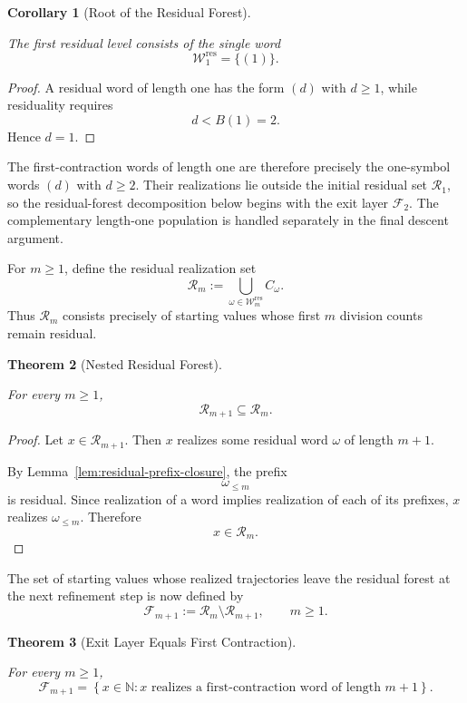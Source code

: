 \documentclass[12pt, oneside]{article}
\numberwithin{equation}{section}
\theoremstyle{definition}
\theoremstyle{plain}
\newtheorem{theorem}{Theorem}[section]
\newtheorem{corollary}[theorem]{Corollary}
\theoremstyle{remark}
\begin{document}
\begin{corollary}[Root of the Residual Forest]
\label{cor:residual-root}

The first residual level consists of the single word
\[
\mathcal W_1^{\mathrm{res}}=\{(1)\}.
\]
\end{corollary}

\begin{proof}
A residual word of length one has the form \((d)\) with \(d\ge1\), while
residuality requires
\[
d<B(1)=2.
\]
Hence \(d=1\).
\end{proof}

The first-contraction words of length one are therefore precisely the
one-symbol words \((d)\) with \(d\ge2\). Their realizations lie outside the
initial residual set \(\mathcal R_1\), so the residual-forest decomposition
below begins with the exit layer \(\mathcal F_2\). The complementary
length-one population is handled separately in the final descent argument.

For \(m\ge1\), define the residual realization set
\[
\mathcal R_m
:=
\bigcup_{\omega\in\mathcal W_m^{\mathrm{res}}}
C_\omega.
\]
Thus \(\mathcal R_m\) consists precisely of starting values whose first
\(m\) division counts remain residual.

\begin{theorem}[Nested Residual Forest]
\label{thm:residual-levels-nested}

For every \(m\ge1\),
\[
\mathcal R_{m+1}\subseteq\mathcal R_m.
\]
\end{theorem}

\begin{proof}
Let \(x\in\mathcal R_{m+1}\). Then \(x\) realizes some residual word
\(\omega\) of length \(m+1\).

By Lemma~\ref{lem:residual-prefix-closure}, the prefix
\[
\omega_{\le m}
\]
is residual. Since realization of a word implies realization of each of its
prefixes, \(x\) realizes \(\omega_{\le m}\). Therefore
\[
x\in\mathcal R_m.
\]
\end{proof}

The set of starting values whose realized trajectories leave the residual
forest at the next refinement step is now defined by
\[
\mathcal F_{m+1}
:=
\mathcal R_m\setminus\mathcal R_{m+1},
\qquad
m\ge1.
\]

\begin{theorem}[Exit Layer Equals First Contraction]
\label{thm:exit-layer-first-contraction}

For every \(m\ge1\),
\[
\mathcal F_{m+1}
=
\left\{
x\in\mathbb N:
x\text{ realizes a first-contraction word of length }m+1
\right\}.
\]
\end{theorem}
\end{document}
